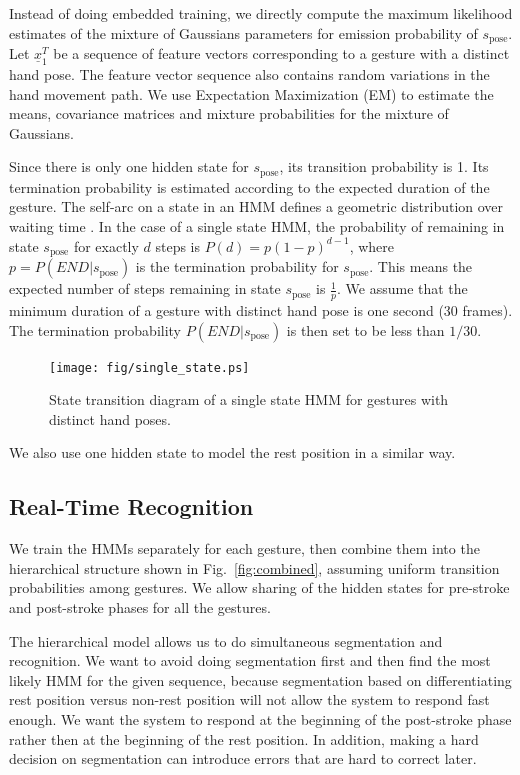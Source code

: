 Instead of doing embedded
training, we directly compute the maximum likelihood estimates of the mixture of
Gaussians parameters for emission probability of  $s_{\text{pose}}$. Let
$\underline{x}_1^T$ be a sequence of feature vectors corresponding to a gesture with a distinct hand pose. 
The feature vector sequence also contains random variations in the hand movement
path. 
We use Expectation Maximization (EM) to estimate the means, covariance matrices
and mixture probabilities for the mixture of Gaussians.

Since there is only one hidden state for $s_{\text{pose}}$, its transition
probability is 1. Its termination probability is estimated according to the
expected duration of the gesture. The self-arc on a state in an HMM defines a 
geometric distribution over waiting time \cite{murphy02}. In the case of a
single state HMM, the probability of remaining in state $s_{\text{pose}}$ for
exactly $d$ steps is $P(d) = p(1-p)^{d - 1}$, where $p = P(END|s_\text{pose})$
is the termination probability for $s_{\text{pose}}$. This means the expected
number of steps remaining in state $s_{\text{pose}}$ is $\frac{1}{p}$. We assume
that the minimum duration of a gesture with distinct hand pose is one second
(30 frames). The termination probability $P(END|s_\text{pose})$ is then set to
be less than $1/30$.

\begin{figure}[t]
\centering
\texttt{[image: fig/single\_state.ps]}
\caption{State transition diagram of a single state HMM for gestures with
distinct hand poses. }
\label{fig:single}
\end{figure}

We also use one hidden state to model the rest position in a similar way.


\subsection{Real-Time Recognition}
We train the HMMs separately for each gesture, then combine them into the
hierarchical structure shown in Fig.~\ref{fig:combined}, assuming uniform
transition probabilities among gestures.
We allow sharing of the hidden states for pre-stroke and post-stroke phases for all the gestures. 

The hierarchical model allows us to do simultaneous segmentation and
recognition. We want to avoid doing segmentation first and then find the most
likely HMM for the given sequence, because segmentation based on
differentiating rest position versus non-rest position will not allow the system
to respond fast enough. We want the system to respond at the beginning of the
post-stroke phase rather then at the beginning of the rest position. In
addition, making a hard decision on segmentation can introduce errors that
are hard to correct later. 

